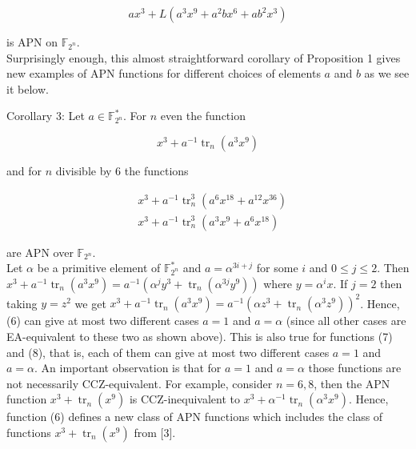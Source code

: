 \documentclass[10pt]{article}
\begin{document}
$$
a x^{3}+L\left(a^{3} x^{9}+a^{2} b x^{6}+a b^{2} x^{3}\right)
$$

is APN on $\mathbb{F}_{2^{n}}$.\\
Surprisingly enough, this almost straightforward corollary of Proposition 1 gives new examples of APN functions for different choices of elements $a$ and $b$ as we see it below.

Corollary 3: Let $a \in \mathbb{F}_{2^{n}}^{*}$. For $n$ even the function


\begin{equation*}
x^{3}+a^{-1} \operatorname{tr}_{n}\left(a^{3} x^{9}\right) \tag{6}
\end{equation*}


and for $n$ divisible by 6 the functions


\begin{align*}
& x^{3}+a^{-1} \operatorname{tr}_{n}^{3}\left(a^{6} x^{18}+a^{12} x^{36}\right)  \tag{7}\\
& x^{3}+a^{-1} \operatorname{tr}_{n}^{3}\left(a^{3} x^{9}+a^{6} x^{18}\right) \tag{8}
\end{align*}


are APN over $\mathbb{F}_{2^{n}}$.\\
Let $\alpha$ be a primitive element of $\mathbb{F}_{2^{n}}^{*}$ and $a=\alpha^{3 i+j}$ for some $i$ and $0 \leq j \leq 2$. Then $x^{3}+a^{-1} \operatorname{tr}_{n}\left(a^{3} x^{9}\right)=a^{-1}\left(\alpha^{j} y^{3}+\right. \left.\operatorname{tr}_{n}\left(\alpha^{3 j} y^{9}\right)\right)$ where $y=\alpha^{i} x$. If $j=2$ then taking $y=z^{2}$ we get $x^{3}+a^{-1} \operatorname{tr}_{n}\left(a^{3} x^{9}\right)=a^{-1}\left(\alpha z^{3}+\operatorname{tr}_{n}\left(\alpha^{3} z^{9}\right)\right)^{2}$. Hence, (6) can give at most two different cases $a=1$ and $a=\alpha$ (since all other cases are EA-equivalent to these two as shown above). This is also true for functions (7) and (8), that is, each of them can give at most two different cases $a=1$ and $a=\alpha$. An important observation is that for $a=1$ and $a=\alpha$ those functions are not necessarily CCZ-equivalent. For example, consider $n=6,8$, then the APN function $x^{3}+\operatorname{tr}_{n}\left(x^{9}\right)$ is CCZ-inequivalent to $x^{3}+\alpha^{-1} \operatorname{tr}_{n}\left(\alpha^{3} x^{9}\right)$. Hence, function (6) defines a new class of APN functions which includes the class of functions $x^{3}+\operatorname{tr}_{n}\left(x^{9}\right)$ from [3].
\end{document}
